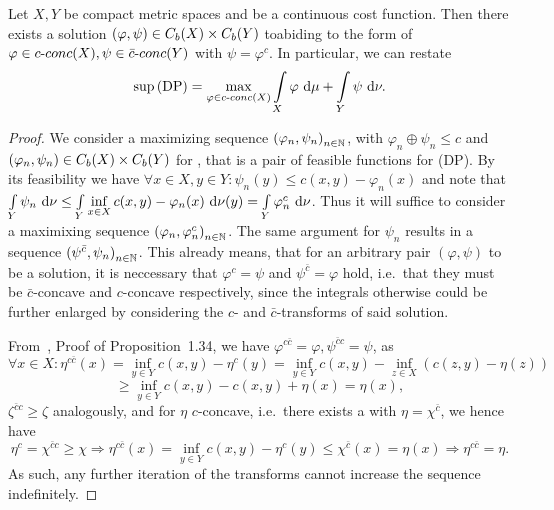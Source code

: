 \begin{theorem}\label{DPSolExist}
	Let $X, Y$ be compact metric spaces and  be a continuous cost function. Then there exists a solution $(\varphi,\psi) \in \CF[b]{X} \times \CF[b]{Y}$ toabiding to the form of $\varphi \in \CConc{X}, \psi \in \CBConc{Y}$ with $\psi = \varphi^c$. In particular, we can restate
	\[ \sup\!\text{\normalfont\,(DP)} = \max\limits_{\varphi \in \CConc{X}} \int\limits_X \varphi~\D + \int\limits_Y \psi~\D[\nu]. \]
\end{theorem}

\begin{proof}
	We consider a maximizing sequence ${(\varphi_n, \psi_n)}_{\NinN}$, with $\varphi_n \oplus \psi_n \le c$ and $(\varphi_n, \psi_n) \in \CF[b]{X} \times \CF[b]{Y}$ for \NinN{}, that is a pair of feasible functions for (DP). By its feasibility we have $\forall x \in X, y \in Y: \psi_n(y) \le c(x, y) - \varphi_n(x)$ and note that $\int\limits_Y \psi_n~\D[\nu] \le \int\limits_Y \inf\limits_{x \in X} c(x, y) - \varphi_n(x)~\Dx[y]{\nu} = \int\limits_Y \varphi_n^c~\D[\nu]$. Thus it will suffice to consider a maximixing sequence ${(\varphi_n, \varphi_n^c)}_{\NinN}$. The same argument for $\psi_n$ results in a sequence ${(\psi^{\bar{c}}, \psi_n)}_{\NinN}$. This already means, that for an arbitrary pair $(\varphi, \psi)$ to be a solution, it is neccessary that $\varphi^c = \psi$ and $\psi^{\bar{c}} = \varphi$ hold, i.e.~that they must be $\bar{c}$-concave and $c$-concave respectively, since the integrals otherwise could be further enlarged by considering the $c$- and $\bar{c}$-transforms of said solution.

	From~\cite{San2015}, Proof of Proposition~1.34, we have $\varphi^{c\bar{c}} = \varphi, \psi^{\bar{c}c} = \psi$, as
	\[ \forall x \in X: \eta^{c\bar{c}}(x) = \inf\limits_{y \in Y} c(x, y) - \eta^c(y) = \inf\limits_{y \in Y} c(x, y) - \inf\limits_{z \in X} (c(z, y) - \eta(z)) \]
	\[ \ge \inf\limits_{y \in Y} c(x, y) - c(x, y) + \eta(x) = \eta(x), \]
	$\zeta^{\bar{c}c} \ge \zeta$ analogously, and for $\eta$ $c$-concave, i.e.~there exists a  with $\eta = \chi^{\bar{c}}$, we hence have
	\[ \eta^c = \chi^{\bar{c}c} \ge \chi \Rightarrow \eta^{c\bar{c}}(x) = \inf\limits_{y \in Y} c(x, y) - \eta^c(y) \le \chi^{\bar{c}}(x) = \eta(x) \Rightarrow \eta^{c\bar{c}} = \eta. \]
	As such, any further iteration of the transforms cannot increase the sequence indefinitely.


\end{proof}

